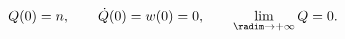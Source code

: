 \begin{equation}
\label{eq:limgauge}
 Q(0)=n,\qquad \dot Q(0)=w(0)=0, \qquad\lim_{\radim\to +\infty}Q = 0.
\end{equation}


